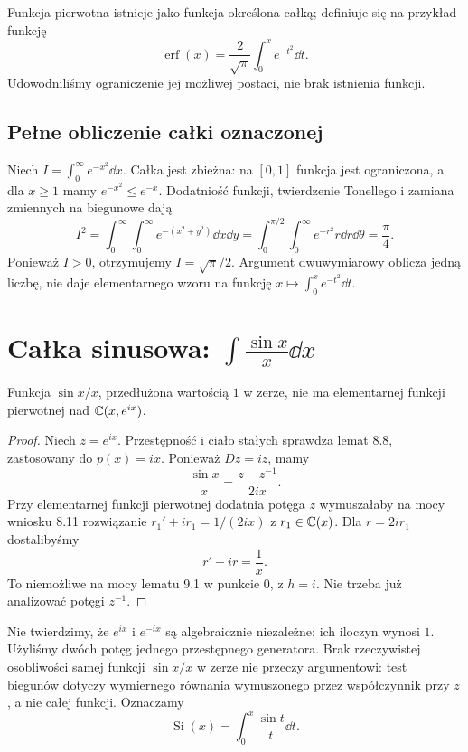 Funkcja pierwotna istnieje jako funkcja określona całką; definiuje się na przykład funkcję
\[
\operatorname{erf}(x)=\frac{2}{\sqrt\pi}\int_0^x e^{-t^2}\dd t.
\]
Udowodniliśmy ograniczenie jej możliwej postaci, nie brak istnienia funkcji.

\subsection{Pełne obliczenie całki oznaczonej}

Niech $I=\int_0^\infty e^{-x^2}\dd x$. Całka jest zbieżna: na $[0,1]$ funkcja jest ograniczona, a dla $x\ge1$ mamy $e^{-x^2}\le e^{-x}$. Dodatniość funkcji, twierdzenie Tonellego i zamiana zmiennych na biegunowe dają
\[
I^2=\int_0^\infty\int_0^\infty e^{-(x^2+y^2)}\dd x\dd y
=\int_0^{\pi/2}\int_0^\infty e^{-r^2}r\dd r\dd\theta
=\frac\pi4.
\]
Ponieważ $I>0$, otrzymujemy $I=\sqrt\pi/2$. Argument dwuwymiarowy oblicza jedną liczbę, nie daje elementarnego wzoru na funkcję $x\mapsto\int_0^x e^{-t^2}\dd t$.

\section{Całka sinusowa: $\int \frac{\sin x}{x}\dd x$}

\begin{twierdzenie}
Funkcja $\sin x/x$, przedłużona wartością $1$ w zerze, nie ma elementarnej funkcji pierwotnej nad $\mathbb{C}(x,e^{ix})$.
\end{twierdzenie}
\begin{proof}
Niech $z=e^{ix}$. Przestępność i ciało stałych sprawdza lemat 8.8, zastosowany do $p(x)=ix$. Ponieważ $Dz=iz$, mamy
\[
\frac{\sin x}{x}=\frac{z-z^{-1}}{2ix}.
\]
Przy elementarnej funkcji pierwotnej dodatnia potęga $z$ wymuszałaby na mocy wniosku 8.11 rozwiązanie $r_1'+ir_1=1/(2ix)$ z $r_1\in\mathbb{C}(x)$. Dla $r=2ir_1$ dostalibyśmy
\[
r'+ir=\frac1x.
\]
To niemożliwe na mocy lematu 9.1 w punkcie $0$, z $h=i$. Nie trzeba już analizować potęgi $z^{-1}$.
\end{proof}

Nie twierdzimy, że $e^{ix}$ i $e^{-ix}$ są algebraicznie niezależne: ich iloczyn wynosi $1$. Użyliśmy dwóch potęg jednego przestępnego generatora. Brak rzeczywistej osobliwości samej funkcji $\sin x/x$ w zerze nie przeczy argumentowi: test biegunów dotyczy wymiernego równania wymuszonego przez współczynnik przy $z$, a nie całej funkcji. Oznaczamy
\[
\operatorname{Si}(x)=\int_0^x\frac{\sin t}{t}\dd t.
\]

